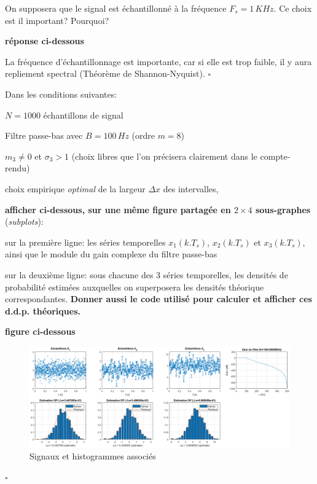 \documentclass{article}
\newcommand{\debutrep}[1]{\color{blue}\begin{center} \hrulefill \textbf{ #1 } \hrulefill \end{center} }
\newcommand{\finrep}{\vspace*{5mm}\hfill $\square$\color{black}\vspace*{5mm}}
\begin{document}
On supposera que le signal est échantillonné à la fréquence $F_s = 1\,KHz$. Ce choix est il important? Pourquoi?

\debutrep{réponse ci-dessous}
 La fréquence d'échantillonnage est importante, car si elle est trop faible, il y aura repliement spectral (Théorème de Shannon-Nyquist).
 \finrep
 
Dans les conditions suivantes:
\begin{list}{-}{\setlength{\leftmargin}{3mm} \setlength{\labelwidth}{20mm} \setlength{\labelsep}{2mm} \setlength{\itemsep}{1mm} }
\item $N=1000$ échantillons de signal
\item Filtre passe-bas avec $B=100\,Hz$ (ordre $m=8$)
\item $m_3 \neq 0$ et $\sigma_3 >1$ (choix libres que l'on précisera clairement dans le compte-rendu)
\item choix empirique {\em optimal} de la largeur $\Delta x$ des intervalles,
\end{list}

\textbf{afficher ci-dessous, sur une même figure partagée en $2 \times 4$ sous-graphes} ({\em subplots}):
\begin{list}{-}{\setlength{\leftmargin}{3mm} \setlength{\labelwidth}{20mm} \setlength{\labelsep}{2mm} \setlength{\itemsep}{1mm} }
\item sur la première ligne: les séries temporelles $x_1(k.T_s)$, $x_2(k.T_s)$ et $x_3(k.T_s)$, ainsi que le module du gain complexe du filtre passe-bas
\item sur la deuxième ligne: sous chacune des 3 séries temporelles, les densités de probabilité estimées auxquelles on superposera les densités théorique correspondantes. \textbf{Donner aussi le code utilisé pour calculer et afficher ces d.d.p. théoriques.}
\end{list}

\newpage
\debutrep{figure ci-dessous} 
\begin{figure}  [H]
    \includegraphics[width=1.15\columnwidth]{plot-basique.png}
    \caption{Signaux et histogrammes associés}
\end{figure}
\finrep
 
\end{document}
